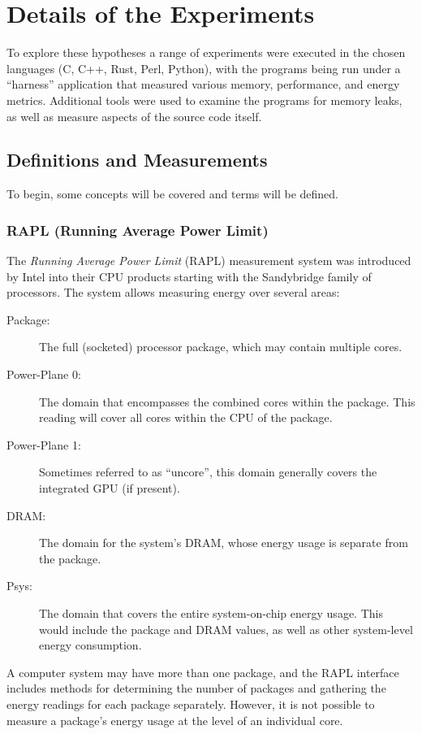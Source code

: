 \section{Details of the Experiments}
\label{sec:experiments}

To explore these hypotheses a range of experiments were executed in the chosen languages (C, C++, Rust, Perl, Python), with the programs being run under a ``harness'' application that measured various memory, performance, and energy metrics. Additional tools were used to examine the programs for memory leaks, as well as measure aspects of the source code itself.

\subsection{Definitions and Measurements}

To begin, some concepts will be covered and terms will be defined.

\subsubsection{RAPL (Running Average Power Limit)}

The \textit{Running Average Power Limit} (RAPL) measurement system was introduced by Intel into their CPU products starting with the Sandybridge family of processors. The system allows measuring energy over several areas:

\begin{description}
\item[Package:] The full (socketed) processor package, which may contain multiple cores.
\item[Power-Plane 0:] The domain that encompasses the combined cores within the package. This reading will cover all cores within the CPU of the package.
\item[Power-Plane 1:] Sometimes referred to as ``uncore'', this domain generally covers the integrated GPU (if present).
\item[DRAM:] The domain for the system's DRAM, whose energy usage is separate from the package.
\item[Psys:] The domain that covers the entire system-on-chip energy usage. This would include the package and DRAM values, as well as other system-level energy consumption.
\end{description}

A computer system may have more than one package, and the RAPL interface includes methods for determining the number of packages and gathering the energy readings for each package separately. However, it is not possible to measure a package's energy usage at the level of an individual core.

